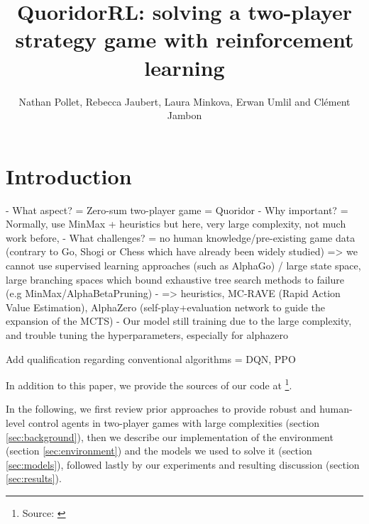 \documentclass[journal, a4paper]{IEEEtran}
\newif\ifanonymous
\begin{document}
\title{QuoridorRL: solving a two-player strategy game with reinforcement learning}
\ifanonymous
\author{Anonymous Authors}
\else
\author{Nathan Pollet, Rebecca Jaubert, Laura Minkova, Erwan Umlil and Clément Jambon}
\fi
\maketitle

\begin{abstract}

\end{abstract}

\section{Introduction}
\label{sec:intro}

- What aspect? = Zero-sum two-player game = Quoridor
- Why important? = Normally, use MinMax + heuristics but here, very large complexity, not much work before, 
- What challenges? = no human knowledge/pre-existing game data (contrary to Go, Shogi or Chess which have already been widely studied) => we cannot use supervised learning approaches (such as AlphaGo\cite{alphago}) / large state space, large branching spaces which bound exhaustive tree search methods to failure (e.g MinMax/AlphaBetaPruning)
- => heuristics, MC-RAVE (Rapid Action Value Estimation), AlphaZero (self-play+evaluation network to guide the expansion of the MCTS)
- Our model still training due to the large complexity, and trouble tuning the hyperparameters, especially for alphazero

Add qualification regarding conventional algorithms = DQN, PPO


In addition to this paper, we provide the sources of our code at  \footnote{Source: \url{}}. 

In the following, we first review prior approaches to provide robust and human-level control agents in two-player games with large complexities (section \ref{sec:background}), then we describe our implementation of the environment (section \ref{sec:environment}) and the models we used to solve it (section \ref{sec:models}), followed lastly by our experiments and resulting discussion (section \ref{sec:results}).
\end{document}
